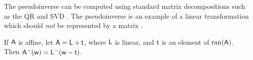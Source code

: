 The pseudoinverse can be computed
using standard matrix decompositions such as
the QR and SVD \cite{golub-vanloan-2012}.
The pseudoinverse is an example of a linear transformation
which should {\em not} be represented by a matrix
\cite{mcdonald-1989b}.

If $\mathsf{A}$ is affine,
let $\mathsf{A} = \mathsf{L} + \mathsf{t}$,
where $\mathsf{L}$ is linear,
and $\mathsf{t}$ is an element of $\mathrm{ran}(\mathsf{A})$.
Then $\mathsf{A}^{-}(\mathsf{w}) = \mathsf{L}^{-}( \mathsf{w} - \mathsf{t} )$.

